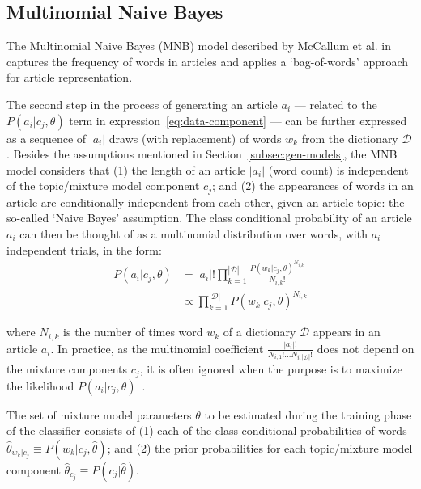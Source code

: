 \subsection{Multinomial Naive Bayes}
\label{subsec:multinomial-naive}

The Multinomial Naive Bayes (MNB) model described by McCallum et al. 
in~\cite{McCallum98acomparison} captures the frequency of words in articles and 
applies a `bag-of-words' approach for article representation.\vertbreak 

The second step in the process of generating an article $a_i$ --- related to the 
$P(a_i|c_j,\theta)$ term in expression~\ref{eq:data-component} --- can be further 
expressed as a sequence of $|a_i|$ draws (with replacement) of words $w_k$ from 
the dictionary $\mathcal{D}$. Besides the assumptions mentioned in 
Section~\ref{subsec:gen-models}, the MNB model considers 
that (1) the length of an article $|a_i|$ (word count) is independent of the 
topic\slash mixture model component $c_j$; and (2) the appearances of words in 
an article are conditionally independent from each other, given an article 
topic: the so-called `Naive Bayes' assumption. The class conditional 
probability of an article $a_i$ can then be thought 
of as a multinomial distribution over words, with $a_i$ independent trials, in 
the form:
\begin{equation}
\begin{split}
    P(a_i|c_j,\theta) &= |a_i|!\prod_{k=1}^{|\mathcal{D}|}\frac{P(w_{k}|c_j,\theta)^{N_{i,k}}}{N_{i,k}!}\\
                &\propto \prod_{k=1}^{|\mathcal{D}|}P(w_{k}|c_j,\theta)^{N_{i,k}}
    \label{eq:data-naive}
\end{split}
\end{equation}

where $N_{i,k}$ is the number of times word $w_k$ of a dictionary $\mathcal{D}$ 
appears in an article $a_i$. In practice, as the multinomial coefficient 
$\frac{|a_i|!}{N_{i,1}! ... N_{i,|\mathcal{D}|}!}$ does not depend on the 
mixture components $c_j$, it is often ignored when the purpose is to maximize 
the likelihood $P(a_i|c_j,\theta)$~\cite{Nigam2000, Kibriya:2004:MNB:2146834.2146882, Su2011}.\vertbreak

The set of mixture model parameters $\theta$ to be estimated 
during the training phase of the classifier consists of (1) each of the class 
conditional probabilities of words 
$\hat{\theta}_{w_k|c_j} \equiv P(w_k|c_j,\hat{\theta})$; and (2) the prior 
probabilities for each topic\slash mixture model 
component $\hat{\theta}_{c_j} \equiv P(c_j|\hat{\theta})$.\vertbreak 

